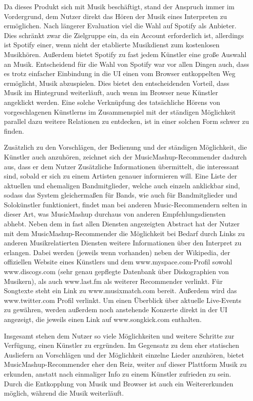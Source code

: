 Da dieses Produkt sich mit Musik beschäftigt, stand der Anspruch immer im Vordergrund, dem Nutzer direkt das Hören der Musik eines Interpreten zu ermöglichen. Nach längerer Evaluation viel die Wahl auf Spotify als Anbieter. Dies schränkt zwar die Zielgruppe ein, da ein Account erforderlich ist, allerdings ist Spotify einer, wenn nicht der etablierte Musikdienst zum kostenlosen Musikhören. Außerdem bietet Spotify zu fast jedem Künstler eine große Auswahl an Musik. Entscheidend für die Wahl von Spotify war vor allen Dingen auch, dass es trotz einfacher Einbindung in die UI einen vom Browser entkoppelten Weg ermöglicht, Musik abzuspielen. Dies bietet den entscheidenden Vorteil, dass Musik im Hintegrund weiterläuft, auch wenn im Browser neue Künstler angeklickt werden. Eine solche Verknüpfung des tatsächliche Hörens von vorgeschlagenen Künstlerns im Zusammenspiel mit der ständigen Möglichkeit parallel dazu weitere Relationen zu entdecken, ist in einer solchen Form schwer zu finden.


Zusätzlich zu den Vorschlägen, der Bedienung und der ständigen Möglichkeit, die Künstler auch anzuhören, zeichnet sich der MusicMashup-Recommender dadurch aus, dass er dem Nutzer Zusätzliche Informationen übermittelt, die interessant sind, sobald er sich zu einem Artisten genauer informieren will. Eine Liste der aktuellen und ehemaligen Bandmitglieder, welche auch einzeln anklickbar sind, sodass das System gleichermaßen für Bands, wie auch für Bandmitglieder und Solokünstler funktioniert, findet man bei anderen Music-Recommendern selten in dieser Art, was MusicMashup durchaus von anderen Empfehlungsdiensten abhebt. 
Neben dem in fast allen Diensten angezeigten Abstract hat der Nutzer mit dem MusicMashup-Recommender die Möglichkeit bei Bedarf durch Links zu anderen Musikrelatierten Diensten weitere Informationen über den Interpret zu erlangen. Dabei werden (jeweils wenn vorhanden) neben der Wikipedia, der offiziellen Website eines Künstlers und dem www.myspace.com-Profil sowohl www.discogs.com (sehr genau gepflegte Datenbank über Diskographien von Musikern), als auch www.last.fm als weiterer Recommender verlinkt. Für Songtexte steht ein Link zu www.musixmatch.com bereit. Außerdem wird das www.twitter.com Profil verlinkt. Um einen Überblick über aktuelle Live-Events zu gewähren, werden außerdem noch anstehende Konzerte direkt in der UI angezeigt, die jeweils einen Link auf www.songkick.com enthalten.


Insgesamt stehen dem Nutzer so viele Möglichkeiten und weitere Schritte zur Verfügung, einen Künstler zu ergründen. Im Gegensatz zu dem eher statischen Ausliefern an Vorschlägen und der Möglichkeit einzelne Lieder anzuhören, bietet MusicMashup-Recommender eher den Reiz, weiter auf dieser Plattform Musik zu erkunden, anstatt nach einmaliger Info zu einem Künstler zufrieden zu sein. Durch die Entkopplung von Musik und Browser ist auch ein Weitererkunden möglich, während die Musik weiterläuft.


